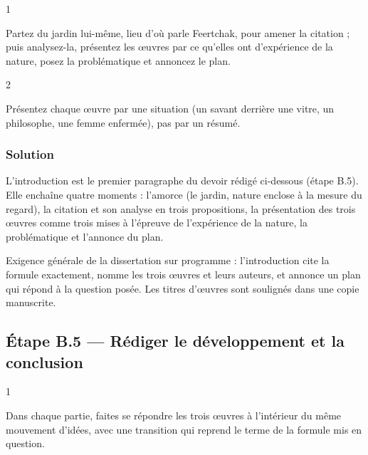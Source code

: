 \documentclass[11pt,a4paper]{article}
\begin{document}
\begin{indication}{1}

Partez du jardin lui-même, lieu d'où parle Feertchak, pour amener la citation ; puis analysez-la, présentez les œuvres par ce qu'elles ont d'expérience de la nature, posez la problématique et annoncez le plan.

\end{indication}

\begin{indication}{2}

Présentez chaque œuvre par une situation (un savant derrière une vitre, un philosophe, une femme enfermée), pas par un résumé.

\end{indication}

\hypertarget{solution-6}{%
\subsubsection{Solution}\label{solution-6}}

L'introduction est le premier paragraphe du devoir rédigé ci-dessous (étape B.5). Elle enchaîne quatre moments : l'amorce (le jardin, nature enclose à la mesure du regard), la citation et son analyse en trois propositions, la présentation des trois œuvres comme trois mises à l'épreuve de l'expérience de la nature, la problématique et l'annonce du plan.

\begin{jury}

Exigence générale de la dissertation sur programme : l'introduction cite la formule exactement, nomme les trois œuvres et leurs auteurs, et annonce un plan qui répond à la question posée. Les titres d'œuvres sont soulignés dans une copie manuscrite.

\end{jury}

\hypertarget{uxe9tape-b.5-ruxe9diger-le-duxe9veloppement-et-la-conclusion}{%
\subsection{Étape B.5 --- Rédiger le développement et la conclusion}\label{uxe9tape-b.5-ruxe9diger-le-duxe9veloppement-et-la-conclusion}}

\begin{indication}{1}

Dans chaque partie, faites se répondre les trois œuvres à l'intérieur du même mouvement d'idées, avec une transition qui reprend le terme de la formule mis en question.

\end{indication}
\end{document}
